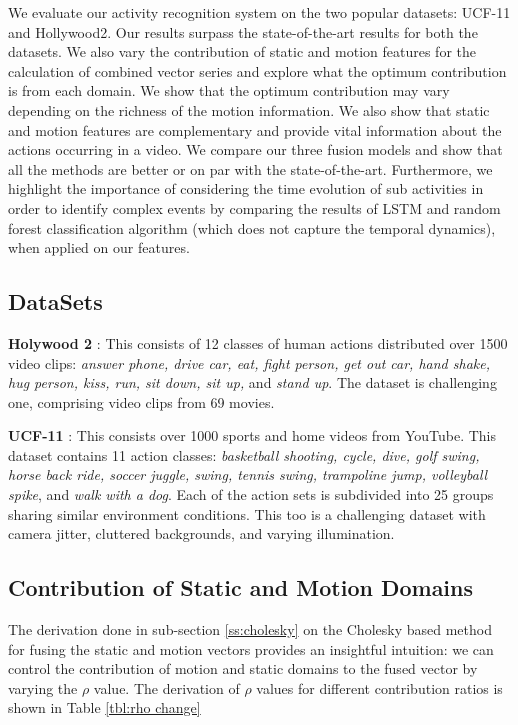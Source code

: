 We evaluate our activity recognition system on the two popular datasets: UCF-11 and Hollywood2. Our results surpass the state-of-the-art
results for both the datasets. We also vary the contribution of static and motion features for the calculation
of combined vector series and explore what the optimum contribution is from each domain. We show that the optimum contribution
may vary depending on the richness of the motion information. We also show that static and motion features
are complementary and provide vital information about the actions occurring in a video. We compare our three fusion models and show that
all the methods are better or on par with the state-of-the-art. Furthermore, we highlight the importance of considering the time evolution
of sub activities in order to identify complex events by comparing the results of LSTM and random forest classification algorithm (which does not capture
the temporal dynamics), when applied on our features.

\subsection{DataSets}
\noindent
\textbf{Holywood 2} \cite{marszalek2009actions}: This consists of 12 classes of human actions distributed over 1500 video clips:
\textit{answer phone, drive car, eat, fight person, get out car, hand shake,
hug person, kiss, run, sit down, sit up, }and \textit{stand up}.
The dataset is challenging one, comprising video clips from 69 movies.

\noindent
\textbf{UCF-11} \cite{liu2009recognizing}: This consists over 1000
sports and home videos from YouTube. This dataset contains 11 action classes:
\textit{basketball shooting, cycle, dive, golf swing, horse
back ride, soccer juggle, swing, tennis swing, trampoline
jump, volleyball spike}, and \textit{walk with a dog}. Each of the action
sets is subdivided into 25 groups sharing similar environment conditions.
This too is a challenging dataset with
camera jitter, cluttered backgrounds, and varying illumination.


\subsection{Contribution of Static and Motion Domains}

The derivation done in sub-section \ref{ss:cholesky} on the Cholesky based method for fusing the static and motion vectors
provides an insightful intuition: we can control the contribution
of motion and static domains to the fused vector by varying the $\rho$ value.
The derivation of $\rho$ values for different contribution ratios is shown in
Table \ref{tbl:rho change}




